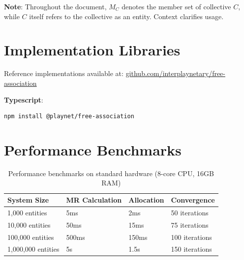 \documentclass[11pt,a4paper]{article}
\theoremstyle{definition}
\theoremstyle{remark}
\begin{document}
\textbf{Note}: Throughout the document, $M_C$ denotes the member set of collective $C$, while $C$ itself refers to the collective as an entity. Context clarifies usage.

\section{Implementation Libraries}

Reference implementations available at: \url{github.com/interplaynetary/free-association}

\textbf{Typescript}:
\begin{verbatim}
npm install @playnet/free-association
\end{verbatim}

\section{Performance Benchmarks}

\begin{table}[h]
\centering
\begin{tabular}{llll}
\toprule
\textbf{System Size} & \textbf{MR Calculation} & \textbf{Allocation} & \textbf{Convergence} \\
\midrule
1,000 entities & 5ms & 2ms & 50 iterations \\
10,000 entities & 50ms & 15ms & 75 iterations \\
100,000 entities & 500ms & 150ms & 100 iterations \\
1,000,000 entities & 5s & 1.5s & 150 iterations \\
\bottomrule
\end{tabular}
\caption{Performance benchmarks on standard hardware (8-core CPU, 16GB RAM)}
\end{table}
\end{document}
